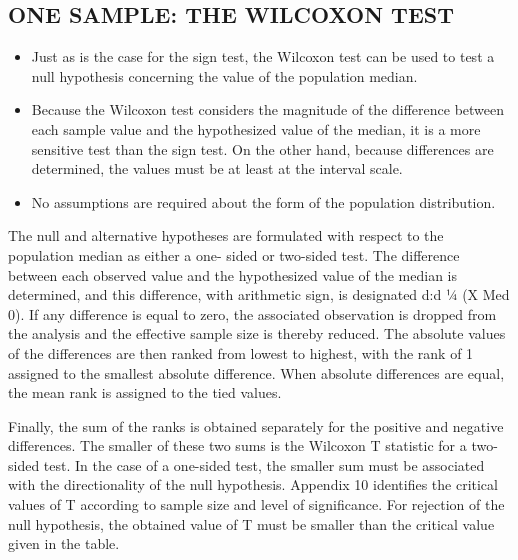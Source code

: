 
\subsection*{ONE SAMPLE: THE WILCOXON TEST}
\begin{itemize}
\item Just as is the case for the sign test, the Wilcoxon test can be used to test a null hypothesis concerning the
value of the population median. 
\item Because the Wilcoxon test considers the magnitude of the difference between
each sample value and the hypothesized value of the median, it is a more sensitive test than the sign test. On the
other hand, because differences are determined, the values must be at least at the interval scale. 
\item No assumptions
are required about the form of the population distribution.
\end{itemize}

The null and alternative hypotheses are formulated with respect to the population median as either a one-
sided or two-sided test. The difference between each observed value and the hypothesized value of the median
is determined, and this difference, with arithmetic sign, is designated d:d ¼ (X  Med 0). If any difference is
equal to zero, the associated observation is dropped from the analysis and the effective sample size is thereby
reduced. The absolute values of the differences are then ranked from lowest to highest, with the rank of 1
assigned to the smallest absolute difference. When absolute differences are equal, the mean rank is assigned to
the tied values. 

Finally, the sum of the ranks is obtained separately for the positive and negative differences. The
smaller of these two sums is the Wilcoxon T statistic for a two-sided test. In the case of a one-sided test, the
smaller sum must be associated with the directionality of the null hypothesis. Appendix 10 identifies the critical
values of T according to sample size and level of significance. For rejection of the null hypothesis, the obtained
value of T must be smaller than the critical value given in the table.

